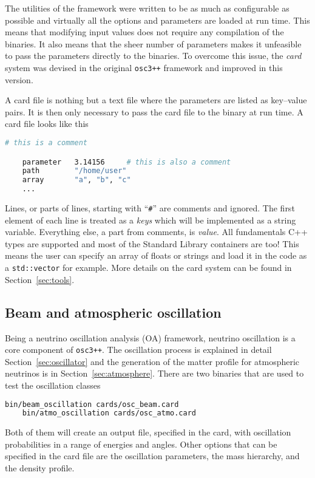\documentclass[a4paper, 11pt]{article}
\newcommand{\refsec}[1]{Section~\ref{#1}}
\begin{document}
The utilities of the framework were written to be as much as configurable as possible and %
virtually all the options and parameters are loaded at run time.
This means that modifying input values does not require any compilation of the binaries.
It also means that the sheer number of parameters makes it unfeasible to pass the parameters %
directly to the binaries.
To overcome this issue, the \emph{card} system was devised in the original \texttt{osc3++} %
framework and improved in this version.

A card file is nothing but a text file where the parameters are listed as key--value pairs.
It is then only necessary to pass the card file to the binary at run time.
A card file looks like this
\begin{lstlisting}[language=bash]
    # this is a comment

    parameter	3.14156		# this is also a comment
    path		"/home/user"
    array		"a", "b", "c"
    ...
\end{lstlisting}
Lines, or parts of lines, starting with ``\texttt{\#}'' are comments and ignored.
The first element of each line is treated as a \emph{keys} which will be implemented %
as a string variable.
Everything else, a part from comments, is \emph{value}.
All fundamentals C++ types are supported and most of the Standard Library containers are too!
This means the user can specify an array of floats or strings and load it in the code as a \texttt{std::vector} for example.
More details on the card system can be found in \refsec{sec:tools}.

\subsection{Beam and atmospheric oscillation}

Being a neutrino oscillation analysis (OA) framework, neutrino oscillation is a core component of %
\texttt{osc3++}.
The oscillation process is explained in detail \refsec{sec:oscillator} %
and the generation of the matter profile for atmospheric neutrinos is in %
\refsec{sec:atmosphere}.
There are two binaries that are used to test the oscillation classes
\begin{lstlisting}[language=bash]
    bin/beam_oscillation cards/osc_beam.card
    bin/atmo_oscillation cards/osc_atmo.card
\end{lstlisting}
Both of them will create an output file, specified in the card, with oscillation %
probabilities in a range of energies and angles.
Other options that can be specified in the card file are the oscillation parameters, %
the mass hierarchy, and the density profile.
\end{document}
